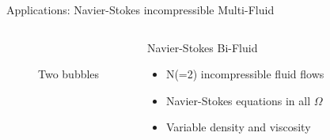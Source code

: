 \documentclass[final,utf8,,hyperref={pdfpagelabels=false}]{beamer}
\newcommand{\goodgap}{%
  \hspace{\subfigtopskip}%
  \hspace{\subfigbottomskip}}
\begin{document}
\begin{frame}[containsverbatim]{}
\begin{columns}[t]
\begin{block}{Applications: Navier-Stokes incompressible Multi-Fluid}
\begin{columns}[t]
\begin{column}{.45\textwidth}
\begin{figure}
      \\
      \goodgap
      \caption{Two bubbles}
      \label{fig:1}
    \end{figure}
      \end{column}
      \begin{column}{.52\textwidth}
          \begin{block}{Navier-Stokes Bi-Fluid}
            \begin{itemize}
            \item N(=2) incompressible fluid flows
            \item Navier-Stokes equations in all  $\Omega$
            \item Variable density and viscosity
              

\end{itemize}
\end{block}
\end{column}
\end{columns}
\end{block}
\end{columns}
\end{frame}
\end{document}
